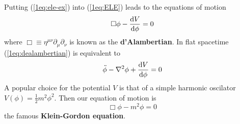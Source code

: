     Putting (\ref{1eq:ele-ex}) into (\ref{1eq:ELE}) leads to the equations of motion
    \begin{equation}\label{1eq:dealambertian}
        \Box \phi-\dv{V}{\phi}=0
    \end{equation}
    where $\Box \equiv\eta^{\mu\nu}\partial_\mu\partial_\nu$ is known as the \textbf{d'Alambertian}.
    In flat spacetime (\ref{1eq:dealambertian}) is equivalent to
    \begin{equation*}
        \ddot{\phi}-\nabla^2\phi+\dv{V}{\phi}=0
    \end{equation*}
    A popular choice for the potential $V$ is that of a simple harmonic oscilator $V(\phi)=\frac{1}{2}m^2\phi^2$. Then our equation of motion is
    \begin{equation*}
        \Box\phi-m^2\phi=0
    \end{equation*}
    the famous \textbf{Klein-Gordon equation}.


